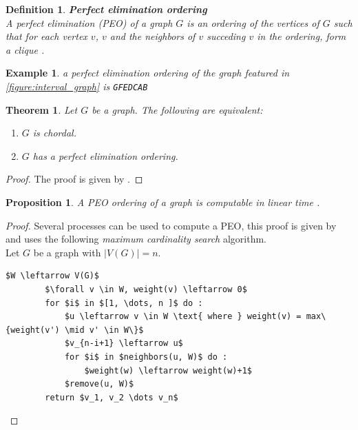 \documentclass{article}
\newtheorem{definition}{Definition}[section]
\newtheorem{theorem}{Theorem}[section]
\newtheorem{proposition}{Proposition}[section]
\newtheorem*{example}{Example}
\begin{document}
\begin{definition}
    \textbf{Perfect elimination ordering} \\ 
    A perfect elimination (PEO) of a graph $G$ 
    is an ordering of the vertices of $G$
    such that for each vertex $v$, $v$ and the neighbors of $v$ 
    succeding $v$ in the ordering, form a clique \cite{rose}.
\end{definition}

\begin{example}
    a perfect elimination ordering of the graph featured in \cref{figure:interval_graph} is
    \texttt{GFEDCAB}
\end{example}

\begin{theorem}
    Let $G$ be a graph. The following are equivalent:
    \begin{enumerate}
        \item $G$ is chordal.
        \item $G$ has a perfect elimination ordering.
    \end{enumerate}
    \label{theorem:chordal_is_peo}
\end{theorem}

\begin{proof}
    The proof is given by \cite{rose}.
\end{proof}


\newpage

\begin{proposition}
    \label{proposition:peo_linear}
    A PEO ordering of a graph is computable in linear time \cite{mario}.
\end{proposition}

\begin{proof}
    Several processes can be used to compute a PEO, this proof is given by \cite{mario}
    and uses the following \emph{maximum cardinality search} algorithm. \\

    Let $G$ be a graph with $|V(G)|=n$.

    \begin{lstlisting}[mathescape=true, caption={Maximum Cardinality Search}, label={lst:MCS}, frame=single]
        $W \leftarrow V(G)$
        $\forall v \in W, weight(v) \leftarrow 0$
        for $i$ in $[1, \dots, n ]$ do :
            $u \leftarrow v \in W \text{ where } weight(v) = max\{weight(v') \mid v' \in W\}$
            $v_{n-i+1} \leftarrow u$
            for $i$ in $neighbors(u, W)$ do :
                $weight(w) \leftarrow weight(w)+1$
            $remove(u, W)$
        return $v_1, v_2 \dots v_n$
    \end{lstlisting}
    


\end{proof}
\end{document}
